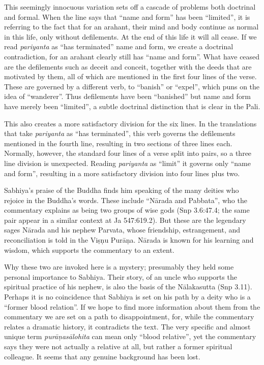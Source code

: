 \documentclass[12pt,openany]{book}%
\begin{document}
This seemingly innocuous variation sets off a cascade of problems both doctrinal and formal. When the line says that “name and form” has been “limited”, it is referring to the fact that for an arahant, their mind and body continue as normal in this life, only without defilements. At the end of this life it will all cease. If we read \textit{pariyanta} as “has terminated” name and form, we create a doctrinal contradiction, for an arahant clearly still has “name and form”. What have ceased are the defilements such as deceit and conceit, together with the deeds that are motivated by them, all of which are mentioned in the first four lines of the verse. These are governed by a different verb, to “banish” or “expel”, which puns on the idea of “wanderer”. Thus defilements have been “banished” but name and form have merely been “limited”, a subtle doctrinal distinction that is clear in the Pali.

This also creates a more satisfactory division for the six lines. In the translations that take \textit{pariyanta} as “has terminated”, this verb governs the defilements mentioned in the fourth line, resulting in two sections of three lines each. Normally, however, the standard four lines of a verse split into pairs, so a three line division is unexpected. Reading \textit{pariyanta} as “limit” it governs only “name and form”, resulting in a more satisfactory division into four lines plus two. 

Sabhiya’s praise of the Buddha finds him speaking of the many deities who rejoice in the Buddha’s words. These include “\textsanskrit{Nārada} and Pabbata”, who the commentary explains as being two groups of wise gods (Snp 3.6:47.4; the same pair appear in a similar context at Ja 547:619.2). But these are the legendary sages \textsanskrit{Nārada} and his nephew Parvata, whose friendship, estrangement, and reconciliation is told in the \textsanskrit{Viṣṇu} \textsanskrit{Purāṇa}. \textsanskrit{Nārada} is known for his learning and wisdom, which supports the commentary to an extent. 

Why these two are invoked here is a mystery; presumably they held some personal importance to Sabhiya. Their story, of an uncle who supports the spiritual practice of his nephew, is also the basis of the \textsanskrit{Nālakasutta} (Snp 3.11). Perhaps it is no coincidence that Sabhiya is set on his path by a deity who is a “former blood relation”. If we hope to find more information about them from the commentary we are set on a path to disappointment, for, while the commentary relates a dramatic history, it contradicts the text. The very specific and almost unique term \textit{\textsanskrit{purāṇasālohita}} can mean only “blood relative”, yet the commentary says they were not actually a relative at all, but rather a former spiritual colleague. It seems that any genuine background has been lost. 
\end{document}
